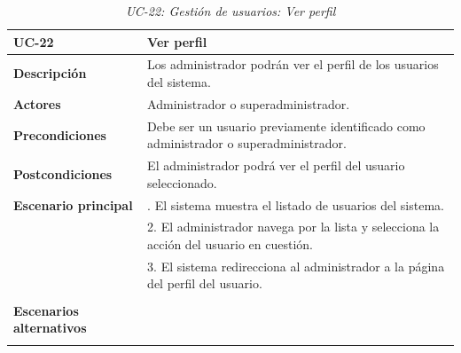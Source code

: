 \begin{table}[H]
  \begin{center}
    \begin{tabularx}{16.4cm}{|l|X|}
      \hline
      \textbf{UC-22} & \textbf{Ver perfil}\\
      \hline
      \textbf{Descripción} & Los administrador podrán ver el perfil de los usuarios del sistema.\\
      \hline
      \textbf{Actores} & Administrador o superadministrador.\\
      \hline
      \textbf{Precondiciones} & Debe ser un usuario previamente identificado como administrador o superadministrador.\\
      \hline
      \textbf{Postcondiciones} & El administrador podrá ver el perfil del usuario seleccionado.\\
      \hline
      \textbf{Escenario principal} & \smallskip 1. El sistema muestra el listado de usuarios del sistema.\\
      & 2. El administrador navega por la lista y selecciona la acción del usuario en cuestión.\\
      & 3. El sistema redirecciona al administrador a la página del perfil del usuario.\\
      & \\
      \hline
      \textbf{Escenarios alternativos} & \\
      & \\
      \hline
    \end{tabularx}
    \caption{\textit{UC-22: Gestión de usuarios: Ver perfil}}
    \label{tab:CU-ver-perfil-admin}
  \end{center}
\end{table}


